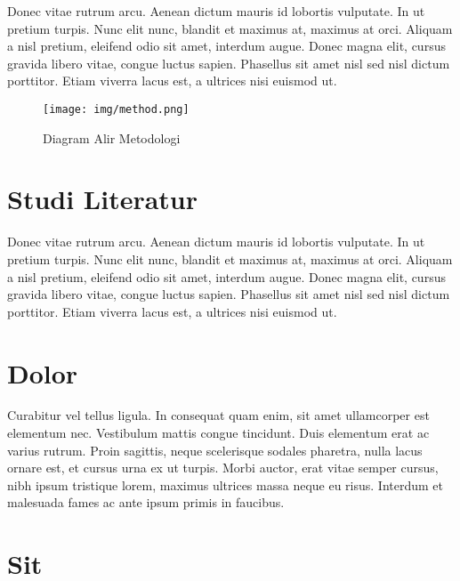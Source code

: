 

Donec vitae rutrum arcu. Aenean dictum mauris id lobortis
vulputate. In ut pretium turpis. Nunc elit nunc, blandit et maximus
at, maximus at orci. Aliquam a nisl pretium, eleifend odio sit amet,
interdum augue. Donec magna elit, cursus gravida libero vitae, congue
luctus sapien. Phasellus sit amet nisl sed nisl dictum
porttitor. Etiam viverra lacus est, a ultrices nisi euismod ut.

\begin{figure}[tph]
  \centering
  \texttt{[image: img/method.png]}
  \caption{Diagram Alir Metodologi}
  \label{fig:diagram-alir}
\end{figure}

\section{Studi Literatur}
\label{subsec:label}

Donec vitae rutrum arcu. Aenean dictum mauris id lobortis
vulputate. In ut pretium turpis. Nunc elit nunc, blandit et maximus
at, maximus at orci. Aliquam a nisl pretium, eleifend odio sit amet,
interdum augue. Donec magna elit, cursus gravida libero vitae, congue
luctus sapien. Phasellus sit amet nisl sed nisl dictum
porttitor. Etiam viverra lacus est, a ultrices nisi euismod ut.


\section{Dolor}
\label{subsec:label}

Curabitur vel tellus ligula. In consequat quam enim, sit amet
ullamcorper est elementum nec. Vestibulum mattis congue
tincidunt. Duis elementum erat ac varius rutrum. Proin sagittis, neque
scelerisque sodales pharetra, nulla lacus ornare est, et cursus urna
ex ut turpis. Morbi auctor, erat vitae semper cursus, nibh ipsum
tristique lorem, maximus ultrices massa neque eu risus. Interdum et
malesuada fames ac ante ipsum primis in faucibus.


\section{Sit}
\label{subsec:label}

